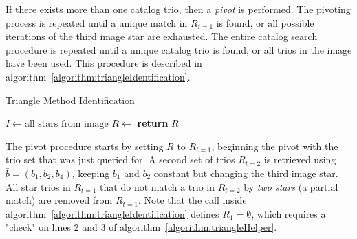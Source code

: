 If there exists more than one catalog trio, then a \textit{pivot} is performed.
The pivoting process is repeated until a unique match in $R_{t=1}$ is found, or all possible iterations of the third
image star are exhausted.
The entire catalog search procedure is repeated until a unique catalog trio is found, or all trios in the image have
been used.
This procedure is described in algorithm~\ref{algorithm:triangleIdentification}.

\begin{algorithm}
    \caption{Triangle Method Identification} \label{algorithm:triangleIdentification}
    \begin{algorithmic}[1]
        \State $I \gets \text{all stars} \text{ from image}$
        \State $R \gets$ 
        \State \textbf{return} $R$
        \EndIf
        \EndFor
        \EndFor
        \EndFor
        \EndProcedure
    \end{algorithmic}
\end{algorithm}

The pivot procedure starts by setting $R$ to $R_{t=1}$, beginning the pivot with the trio set that was just queried
for.
A second set of trios $R_{t=2}$ is retrieved using $\bar{b} = (b_1, b_2, b_4)$, keeping $b_1$ and $b_2$ constant
but changing the third image star.
All star trios in $R_{t=1}$ that do not match a trio in $R_{t=2}$ by \textit{two stars} (a partial match) are removed
from $R_{t=1}$.
Note that the  call inside algorithm~\ref{algorithm:triangleIdentification}
defines $R_1 = \emptyset$, which requires a "check" on lines 2 and 3 of algorithm~\ref{algorithm:triangleHelper}.

